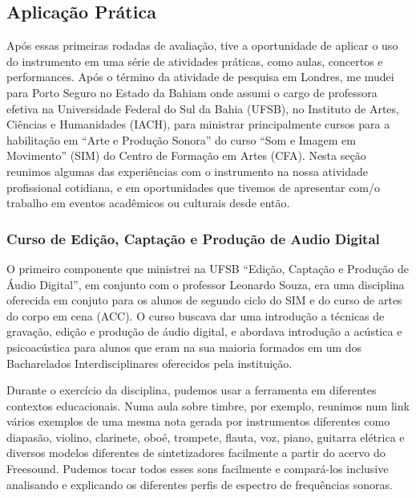 \subsection{Aplicação Prática}
Após essas primeiras rodadas de avaliação, tive a oportunidade de aplicar o uso do instrumento em uma série de atividades práticas, como aulas, concertos e performances. Após o término da atividade de pesquisa em Londres, me mudei para Porto Seguro no Estado da Bahiam onde assumi o cargo de professora efetiva na Universidade Federal do Sul da Bahia (UFSB), no Instituto de Artes, Ciências e Humanidades (IACH), para ministrar principalmente cursos para a habilitação em ``Arte e Produção Sonora'' do curso ``Som e Imagem em Movimento'' (SIM) do Centro de Formação em Artes (CFA). Nesta seção reunimos algumas das experiências com o instrumento na nossa atividade profissional cotidiana, e em oportunidades que tivemos de apresentar com/o trabalho em eventos acadêmicos ou culturais desde então.


\subsubsection{Curso de Edição, Captação e Produção de Audio Digital}

O primeiro componente que ministrei na UFSB ``Edição, Captação e Produção de Áudio Digital'', em conjunto com o professor Leonardo Souza, era uma disciplina oferecida em conjuto para os alunos de segundo ciclo do SIM e do curso de artes do corpo em cena (ACC). O curso buscava dar uma introdução a técnicas de gravação, edição e produção de áudio digital, e abordava introdução a acústica e psicoacústica para alunos que eram na sua maioria formados em um dos Bacharelados Interdisciplinares oferecidos pela instituição. 

Durante o exercício da disciplina, pudemos usar a ferramenta em diferentes contextos educacionais. Numa aula sobre timbre, por exemplo, reunimos num link vários exemplos de uma mesma nota gerada por instrumentos diferentes como diapasão, violino, clarinete, oboé, trompete, flauta, voz, piano, guitarra elétrica e diversos modelos diferentes de sintetizadores facilmente a partir do acervo do Freesound. Pudemos tocar todos esses sons facilmente e compará-los inclusive analisando e explicando os diferentes perfis de espectro de frequências sonoras.

